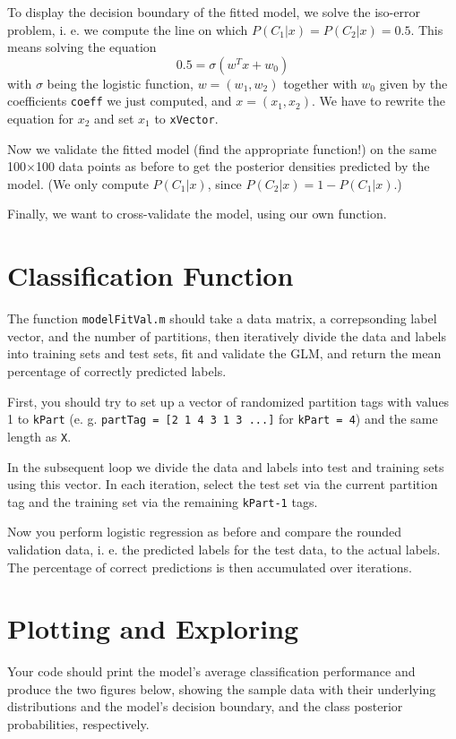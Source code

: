 \documentclass[10pt,a4paper,notitlepage]{report}
\begin{document}
To display the decision boundary of the fitted model, we solve the iso-error problem, i. e. we compute the line on which $P(C_1|x) = P(C_2|x) = 0.5$. This means solving the equation
\begin{equation*}
0.5 = \sigma (w^Tx+w_0)
\end{equation*}
with $\sigma$ being the logistic function, $w=(w_1,w_2)$ together with $w_0$ given by the coefficients \texttt{coeff} we just computed, and $x=(x_1,x_2)$. We have to rewrite the equation for $x_2$ and set $x_1$ to \texttt{xVector}.

Now we validate the fitted model (find the appropriate function!) on the same 100$\times$100 data points as before to get the posterior densities predicted by the model. (We only compute $P(C_1|x)$, since $P(C_2|x)=1-P(C_1|x)$.)

Finally, we want to cross-validate the model, using our own function.

\section*{Classification Function}
The function \texttt{modelFitVal.m} should take a data matrix, a correpsonding label vector, and the number of partitions, then iteratively divide the data and labels into training sets and test sets, fit and validate the GLM, and return the mean percentage of correctly predicted labels.

First, you should try to set up a vector of randomized partition tags with values 1 to \texttt{kPart} (e. g. \texttt{partTag = [2 1 4 3 1 3 ...]} for \texttt{kPart = 4}) and the same length as \texttt{X}.

In the subsequent loop we divide the data and labels into test and training sets using this vector. In each iteration, select the test set via the current partition tag and the training set via the remaining \texttt{kPart-1} tags.

Now you perform logistic regression as before and compare the rounded validation data, i. e. the predicted labels for the test data, to the actual labels. The percentage of correct predictions is then accumulated over iterations.

\section*{Plotting and Exploring}
Your code should print the model's average classification performance and produce the two figures below, showing the sample data with their underlying distributions and the model's decision boundary, and the class posterior probabilities, respectively.
\end{document}

